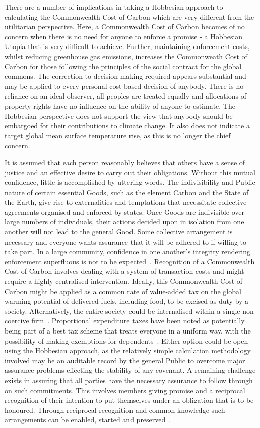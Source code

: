 \documentclass[11pt, oneside]{book}   	%
\begin{document}
There are a number of implications in taking a Hobbesian approach to calculating the Commonwealth Cost of Carbon which are very different from the utilitarian perspective.
Here, a Commonwealth Cost of Carbon becomes of no concern when there is no need for anyone to enforce a promise - a Hobbesian Utopia that is very difficult to achieve.
Further, maintaining enforcement costs, whilst reducing greenhouse gas emissions, increases the Commonweath Cost of Carbon for those following the principles of the social contract for the global commons.
The correction to decision-making required appears substantial and may be applied to every personal cost-based decision of anybody.
There is no reliance on an ideal observer, all peoples are treated equally and allocations of property rights have no influence on the ability of anyone to estimate.
The Hobbesian perspective does not support the view that anybody should be embargoed for their contributions to climate change.
It also does not indicate a target global mean surface temperature rise, as this is no longer the chief concern.\

It is assumed that each person reasonably believes that others have a sense of justice and an effective desire to carry out their obligations.
Without this mutual confidence, little is accomplished by uttering words.
The indivisibility and Public nature of certain essential Goods, such as the element Carbon and the State of the Earth, give rise to externalities and temptations that necessitate collective agreements organised and enforced by states.
Once Goods are indivisible over large numbers of individuals, their actions decided upon in isolation from one another will not lead to the general Good.
Some collective arrangement is necessary and everyone wants assurance that it will be adhered to if willing to take part. In a large community, confidence in one another's integrity rendering enforcement superfluous is not to be expected~\cite{jr1}.
Recognition of a Commonwealth Cost of Carbon involves dealing with a system of transaction costs and might require a highly centralised intervention.
Ideally, this Commonwealth Cost of Carbon might be applied as a common rate of value-added tax on the global warming potential of delivered fuels, including food, to be excised as duty by a society.
Alternatively, the entire society could be internalised within a single non-coercive firm~\cite{rc1}.
Proportional expenditure taxes have been noted as potentially being part of a best tax scheme that treats everyone in a uniform way, with the possibility of making exemptions for dependents~\cite{nk1}.
Either option could be open using the Hobbesian approach, as the relatively simple calculation methodology involved may be an auditable record by the general Public to overcome major assurance problems effecting the stability of any covenant.
A remaining challenge exists in assuring that all parties have the necessary assurance to follow through on such commitments.
This involves members giving promise and a reciprocal recognition of their intention to put themselves under an obligation that is to be honoured.
Through reciprocal recognition and common knowledge such arrangements can be enabled, started and preserved~\cite{hp1}.\
\end{document}
